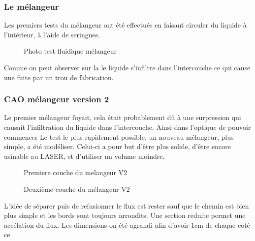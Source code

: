 \documentclass[a4paper, 11pt]{article}
\begin{document}
\subsubsection{Le mélangeur}
Les premiers tests du mélangeur ont été effectués en faisant circuler du liquide à l'intérieur, à l'aide de seringues.
\begin{figure}[H]
    \centering
    \caption{Photo test fluidique mélangeur}
    \label{fig:fuite_melangeurV1}
\end{figure}
Comme on peut observer sur la \label{fig:fuite_melangeur} le liquide s'infiltre dans l'intercouche ce qui cause une fuite
par un trou de fabrication.
\subsubsection{CAO mélangeur version 2}
Le premier mélangeur fuyait, cela était probablement dû à une surpression qui causait
l'infiltration du liquide dans l'intercouche. Ainsi dans l'optique de pouvoir commencer
Le test le plus rapidement possible, un nouveau mélangeur, plus simple, a été modéliser.
Celui-ci a pour but d'être plus solide, d'être encore usinable au LASER, et d'utiliser un volume moindre.
\begin{multicols}{2}
    \begin{figure}[H]
        \centering
        \caption{Premiere couche du melangeur V2}
        \label{fig: CAO_melangeur_V2_couche1}
    \end{figure}
    \begin{figure}[H]
        \centering
        \caption{Deuxième couche du mélangeur V2}
        \label{fig:CAO_melangeur_V2_couche2}
    \end{figure}
\end{multicols}
L'idée de séparer puis de refusionner le flux est rester
sauf que le chemin est bien plus simple et les bords sont toujours
arrondits. Une section reduite permet une accélation du flux.
Les dimensions on été agrandi afin d'avoir 1cm de chaque coté ce
\end{document}
